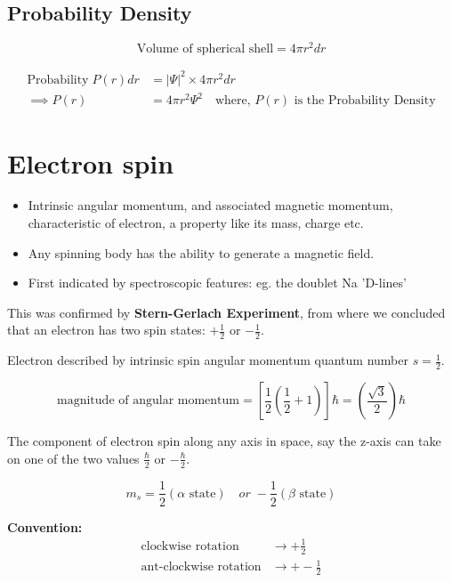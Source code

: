\documentclass[12pt]{article}
\theoremstyle{definition}
\theoremstyle{definition}
\begin{document}
\subsection{Probability Density}%
\label{sub:Probability Density}

\[
	\textrm{Volume of spherical shell} = 4 \pi r^2 dr
\]

\begin{align*}
	\textrm{Probability}\;P(r)dr &= \left| \Psi \right|^2 \times 4\pi r^2 dr\\
	\implies P(r) &= 4 \pi r^2 \Psi^2\quad \textrm{where, $P(r)$ is the Probability Density} 
\end{align*}

\section{Electron spin}

\begin{itemize}
	\item Intrinsic angular momentum, and associated magnetic momentum, characteristic of electron, a property like its mass, charge etc.
	\item Any spinning body has the ability to generate a magnetic field. 
	\item First indicated by spectroscopic features: eg. the doublet Na 'D-lines'
\end{itemize}

This was confirmed by \textbf{Stern-Gerlach Experiment}, from where we concluded that an electron has two spin states: $+\frac{1}{2}$ or $-\frac{1}{2}$.  

Electron described by intrinsic spin angular momentum quantum number $s = \frac{1}{2}$.

\[
	\textrm{magnitude of angular momentum} = \left[ \frac{1}{2} \left( \frac{1}{2} + 1 \right) \right] \hbar = \left( \frac{\sqrt{3}}{2}  \right) \hbar
\]

The component of electron spin along any axis in space, say the z-axis can take on one of the two values $\frac{\hbar}{2}$ or $-\frac{\hbar}{2}$.

\[
	m_s = \frac{1}{2} ( \textrm{$\alpha$ state} )\quad or \; -\frac{1}{2} ( \textrm{$\beta$ state} ) 
\]

\textbf{Convention:} 
\begin{align*}
	\textrm{clockwise rotation} &\rightarrow + \frac{1}{2} \\
	\textrm{ant-clockwise rotation} &\rightarrow + -\frac{1}{2} \\
\end{align*}
\end{document}
